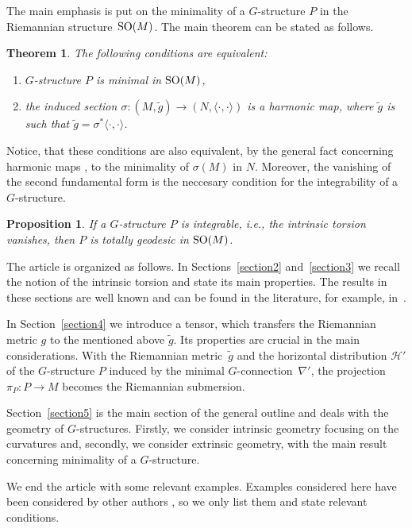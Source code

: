 \documentclass[10pt,a4paper]{amsart}
\numberwithin{equation}{section}
\newtheorem*{Theorem*}{Theorem}
\newtheorem*{Proposition*}{Proposition}
 { \theoremstyle{definition}
\newtheorem{Example}[Theorem]{Example}
\newtheorem{Remark}[Theorem]{Remark} }
\newcommand{\skal}[2]{\langle #1,#2\rangle}
\begin{document}
The main emphasis is put on the minimality of a $G$-structure $P$ in the Riemannian struc\-tu\-re~${\rm SO}(M)$. The main theorem can be stated as follows.
\begin{Theorem*}
The following conditions are equivalent:
\begin{enumerate}\itemsep=0pt
\item[$1)$] $G$-structure $P$ is minimal in ${\rm SO}(M)$,
\item[$2)$] the induced section $\sigma\colon (M,\tilde{g})\to (N,\skal{\cdot}{\cdot})$ is a harmonic map, where $\tilde{g}$ is such that $\tilde{g}=\sigma^{\ast}\skal{\cdot}{\cdot}$.
\end{enumerate}
\end{Theorem*}
Notice, that these conditions are also equivalent, by the general fact concerning harmonic maps \cite{el}, to the minimality of $\sigma(M)$ in $N$. Moreover, the vanishing of the second fundamental form is the neccesary condition for the integrability of a $G$-structure.
\begin{Proposition*}
If a $G$-structure $P$ is integrable, i.e., the intrinsic torsion vanishes, then $P$ is totally geodesic in ${\rm SO}(M)$.
\end{Proposition*}

The article is organized as follows. In Sections~\ref{section2} and~\ref{section3} we recall the notion of the intrinsic torsion and state its main properties. The results in these sections are well known and can be found in the literature, for example, in~\cite{gmc2,cw2}.

In Section~\ref{section4} we introduce a tensor, which transfers the Riemannian metric $g$ to the mentioned above $\tilde{g}$. Its properties are crucial in the main considerations. With the Riemannian metric~$\tilde{g}$ and the horizontal distribution $\mathcal{H}'$ of the $G$-structure $P$ induced by the minimal $G$-connec\-tion~$\nabla '$, the projection $\pi_P\colon P\to M$ becomes the Riemannian submersion.

Section~\ref{section5} is the main section of the general outline and deals with the geometry of $G$-structures. Firstly, we consider intrinsic geometry focusing on the curvatures and, secondly, we consider extrinsic geometry, with the main result concerning minimality of a $G$-structure.

We end the article with some relevant examples. Examples considered here have been considered by other authors \cite{ggv,gd,hl}, so we only list them and state relevant conditions.
\end{document}
